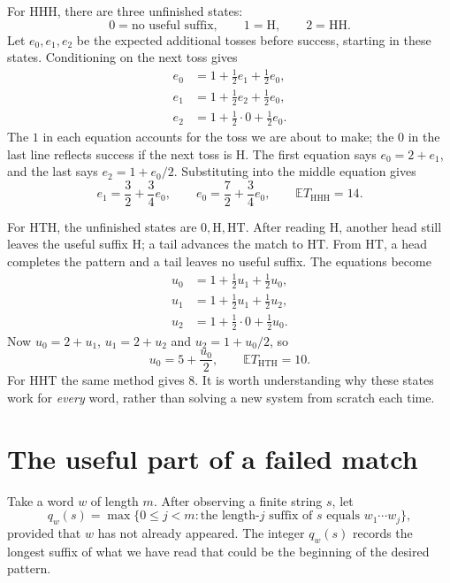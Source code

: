 For \(\mathrm{HHH}\), there are three unfinished states:
\[
 0=\text{no useful suffix},\qquad
 1=\mathrm H,\qquad
 2=\mathrm{HH}.
\]
Let \(e_0,e_1,e_2\) be the expected additional tosses before success, starting in these states. Conditioning on the next toss gives
\begin{align*}
 e_0&=1+\tfrac12e_1+\tfrac12e_0,\\
 e_1&=1+\tfrac12e_2+\tfrac12e_0,\\
 e_2&=1+\tfrac12\cdot0+\tfrac12e_0.
\end{align*}
The \(1\) in each equation accounts for the toss we are about to make; the \(0\) in the last line reflects success if the next toss is \(\mathrm H\). The first equation says \(e_0=2+e_1\), and the last says \(e_2=1+e_0/2\). Substituting into the middle equation gives
\[
 e_1=\frac32+\frac34e_0,
 \qquad
 e_0=\frac72+\frac34e_0,
 \qquad
 \boxed{\mathbb ET_{\mathrm{HHH}}=14}.
\]

For \(\mathrm{HTH}\), the unfinished states are \(0,\mathrm H,\mathrm{HT}\). After reading \(\mathrm H\), another head still leaves the useful suffix \(\mathrm H\); a tail advances the match to \(\mathrm{HT}\). From \(\mathrm{HT}\), a head completes the pattern and a tail leaves no useful suffix. The equations become
\begin{align*}
 u_0&=1+\tfrac12u_1+\tfrac12u_0,\\
 u_1&=1+\tfrac12u_1+\tfrac12u_2,\\
 u_2&=1+\tfrac12\cdot0+\tfrac12u_0.
\end{align*}
Now \(u_0=2+u_1\), \(u_1=2+u_2\) and \(u_2=1+u_0/2\), so
\[
 u_0=5+\frac{u_0}{2},
 \qquad
 \boxed{\mathbb ET_{\mathrm{HTH}}=10}.
\]
For \(\mathrm{HHT}\) the same method gives \(8\). It is worth understanding why these states work for \emph{every} word, rather than solving a new system from scratch each time.

\section{The useful part of a failed match}

Take a word \(w\) of length \(m\). After observing a finite string \(s\), let
\begin{equation}
 q_w(s)=\max\bigl\{0\leq j<m:
             \text{the length-\(j\) suffix of \(s\) equals }
             w_1\cdots w_j\bigr\},
 \label{eq:N20261107-state}
\end{equation}
provided that \(w\) has not already appeared. The integer \(q_w(s)\) records the longest suffix of what we have read that could be the beginning of the desired pattern.

